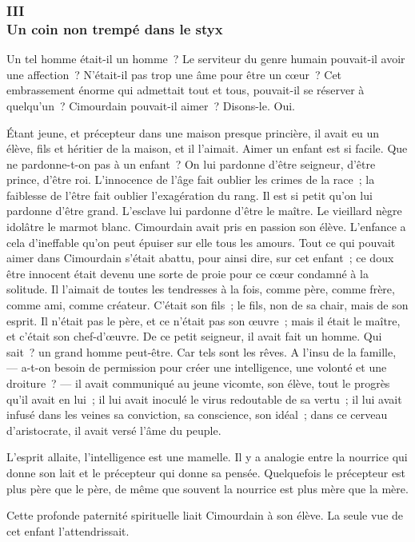 \documentclass[french,twoside]{book} %
\begin{document}
 \subsubsection[{III. Un coin non trempé dans le styx}]{III \\
Un coin non trempé dans le styx}
\label{p2l1c3}
\noindent Un tel homme était-il un homme ? Le serviteur du genre humain pouvait-il avoir une affection ? N’était-il pas trop une âme pour être un cœur ? Cet embrassement énorme qui admettait tout et tous, pouvait-il se réserver à quelqu’un ? Cimourdain pouvait-il aimer ? Disons-le. Oui.\par
Étant jeune, et précepteur dans une maison presque princière, il avait eu un élève, fils et héritier de la maison, et il l’aimait. Aimer un enfant est si facile. Que ne pardonne-t-on pas à un enfant ? On lui pardonne d’être seigneur, d’être prince, d’être roi. L’innocence de l’âge fait oublier les crimes de la race ; la faiblesse de l’être fait oublier l’exagération du rang. Il est si petit qu’on lui pardonne d’être grand. L’esclave lui pardonne d’être le maître. Le vieillard nègre idolâtre le marmot blanc. Cimourdain avait pris en passion son élève. L’enfance a cela d’ineffable qu’on peut épuiser sur elle tous les amours. Tout ce qui pouvait aimer dans Cimourdain s’était abattu, pour ainsi dire, sur cet enfant ; ce doux être innocent était devenu une sorte de proie pour ce cœur condamné à  la solitude. Il l’aimait de toutes les tendresses à la fois, comme père, comme frère, comme ami, comme créateur. C’était son fils ; le fils, non de sa chair, mais de son esprit. Il n’était pas le père, et ce n’était pas son œuvre ; mais il était le maître, et c’était son chef-d’œuvre. De ce petit seigneur, il avait fait un homme. Qui sait ? un grand homme peut-être. Car tels sont les rêves. A l’insu de la famille, — a-t-on besoin de permission pour créer une intelligence, une volonté et une droiture ? — il avait communiqué au jeune vicomte, son élève, tout le progrès qu’il avait en lui ; il lui avait inoculé le virus redoutable de sa vertu ; il lui avait infusé dans les veines sa conviction, sa conscience, son idéal ; dans ce cerveau d’aristocrate, il avait versé l’âme du peuple.\par
L’esprit allaite, l’intelligence est une mamelle. Il y a analogie entre la nourrice qui donne son lait et le précepteur qui donne sa pensée. Quelquefois le précepteur est plus père que le père, de même que souvent la nourrice est plus mère que la mère.\par
Cette profonde paternité spirituelle liait Cimourdain à son élève. La seule vue de cet enfant l’attendrissait.\par
\end{document}

